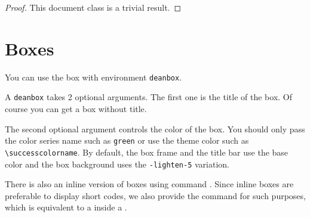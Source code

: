 \documentclass[lineno=off]{wunschnote}
\begin{document}
    \begin{proof}
        This document class is a trivial result.
    \end{proof}

    \section{Boxes}
    \label{sec:boxes}
    \begin{wunschbox}
        You can use the box with environment \verb|deanbox|.
    \end{wunschbox}

    \begin{wunschbox}[]
        A \verb|deanbox| takes 2 optional arguments. The first one is the title of the box. Of course you can get a box without title.
    \end{wunschbox}

    \begin{wunschbox}
        The second optional argument controls the color of the box. You should only pass the color series name such as \verb|green| or use the theme color such as \verb|\successcolorname|. By default, the box frame and the title bar use the base color and the box background uses the \verb|-lighten-5| variation.
    \end{wunschbox}

    There is also an inline version of boxes using command . Since inline boxes are preferable to display short codes, we also provide the command  for such purposes, which is equivalent to a  inside a .


    \lipsum
\end{document}
